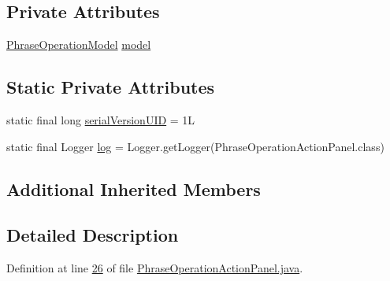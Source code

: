 \subsection*{Private Attributes}
\begin{DoxyCompactItemize}
\item 
\hyperlink{classcom_1_1poly_1_1nlp_1_1filekommander_1_1views_1_1models_1_1_phrase_operation_model}{Phrase\-Operation\-Model} \hyperlink{classcom_1_1poly_1_1nlp_1_1filekommander_1_1views_1_1panels_1_1_phrase_operation_action_panel_ac8380b5cb091933bcb138d4b7471d3c1}{model}
\end{DoxyCompactItemize}
\subsection*{Static Private Attributes}
\begin{DoxyCompactItemize}
\item 
static final long \hyperlink{classcom_1_1poly_1_1nlp_1_1filekommander_1_1views_1_1panels_1_1_phrase_operation_action_panel_a422015c9557a6c51405b4eab27b52452}{serial\-Version\-U\-I\-D} = 1\-L
\item 
static final Logger \hyperlink{classcom_1_1poly_1_1nlp_1_1filekommander_1_1views_1_1panels_1_1_phrase_operation_action_panel_a7f7421f37f3cd27c33006cc3da85ec7a}{log} = Logger.\-get\-Logger(Phrase\-Operation\-Action\-Panel.\-class)
\end{DoxyCompactItemize}
\subsection*{Additional Inherited Members}


\subsection{Detailed Description}


Definition at line \hyperlink{L26}{26} of file \hyperlink{}{Phrase\-Operation\-Action\-Panel.\-java}.



